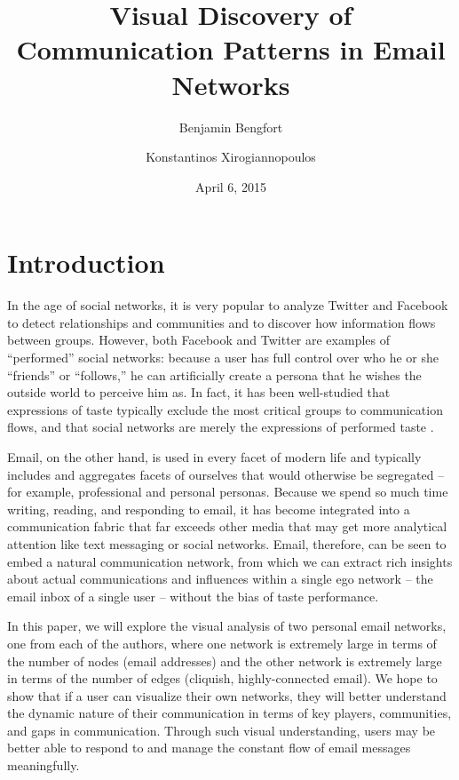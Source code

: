 \documentclass[11pt,letterpaper]{article}
\begin{document}
\title{Visual Discovery of Communication Patterns in Email Networks}

\author[ ]{Benjamin Bengfort}
\author[ ]{Konstantinos Xirogiannopoulos}

\date{April 6, 2015}

\maketitle

\section*{Introduction}

In the age of social networks, it is very popular to analyze Twitter and Facebook to detect relationships and communities and to discover how information flows between groups. However, both Facebook and Twitter are examples of ``performed'' social networks: because a user has full control over who he or she ``friends'' or ``follows,'' he can artificially create a persona that he wishes the outside world to perceive him as. In fact, it has been well-studied that expressions of taste typically exclude the most critical groups to communication flows, and that social networks are merely the expressions of performed taste \cite{liu_social_2007}.

Email, on the other hand, is used in every facet of modern life and typically includes and aggregates facets of ourselves that would otherwise be segregated -- for example, professional and personal personas. Because we spend so much time writing, reading, and responding to email, it has become integrated into a communication fabric that far exceeds other media that may get more analytical attention like text messaging or social networks. Email, therefore, can be seen to embed a natural communication network, from which we can extract rich insights about actual communications and influences within a single ego network -- the email inbox of a single user -- without the bias of taste performance.

In this paper, we will explore the visual analysis of two personal email networks, one from each of the authors, where one network is extremely large in terms of the number of nodes (email addresses) and the other network is extremely large in terms of the number of edges (cliquish, highly-connected email). We hope to show that if a user can visualize their own networks, they will better understand the dynamic nature of their communication in terms of key players, communities, and gaps in communication. Through such visual understanding, users may be better able to respond to and manage the constant flow of email messages meaningfully.
\end{document}
